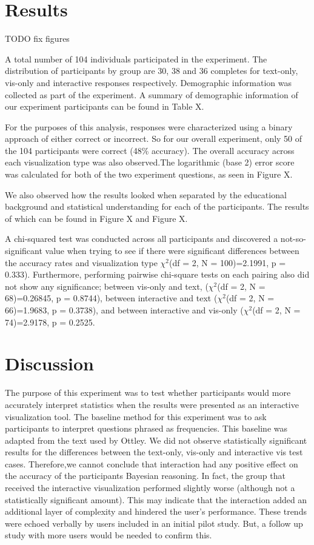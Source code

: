 \section{Results}

TODO fix figures

A total number of 104 individuals participated in the experiment. The
distribution of participants by group are 30, 38 and 36 completes for
text-only, vis-only and interactive responses respectively. Demographic
information was collected as part of the experiment. A summary of demographic
information of our experiment participants can be found in Table X.

For the purposes of this analysis, responses were characterized using a
binary approach of either correct or incorrect. So for our overall
experiment, only 50 of the 104 participants were correct (48\% accuracy). The
overall accuracy across each visualization type was also observed.The
logarithmic (base 2) error score was calculated for both of the two
experiment questions, as seen in Figure X.

We also observed how the results looked when separated by the educational
background and statistical understanding for each of the participants. The
results of which can be found in Figure X and Figure X.

A chi-squared test was conducted across all participants and discovered a
not-so-significant value when trying to see if there were significant
differences between the accuracy rates and visualization type $\chi^2$(df = 2, N = 100)=2.1991, p = 0.333). Furthermore,
performing pairwise chi-square tests on each pairing also did not show any
significance; between vis-only and text, ($\chi^2$(df = 2, N = 68)=0.26845, p =
0.8744), between interactive and text ($\chi^2$(df = 2, N = 66)=1.9683, p =
0.3738), and between interactive and vis-only ($\chi^2$(df = 2, N = 74)=2.9178,
p = 0.2525.



\section{Discussion}
The purpose of this experiment was to test whether participants would more
accurately interpret statistics when the results were presented as an
interactive visualization tool. The baseline method for this experiment was
to ask participants to interpret questions phrased as frequencies. This
baseline was adapted from the text used by Ottley. We did not observe
statistically significant results for the differences between the text-only,
vis-only and interactive vis test cases. Therefore,we cannot conclude that
interaction had any positive effect on the accuracy of the participants
Bayesian reasoning. In fact, the group that received the interactive
visualization performed slightly worse (although not a statistically
significant amount). This may indicate that the interaction added an
additional layer of complexity and hindered the user's performance. These
trends were echoed verbally by users included in an initial pilot study. But,
a follow up study with more users would be needed to confirm this.

